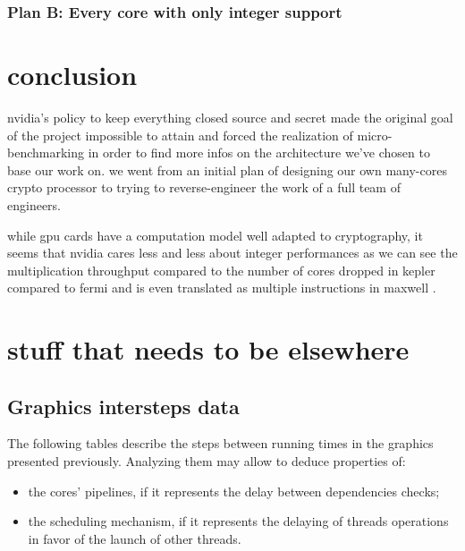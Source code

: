 \documentclass{report}
\begin{document}
   \subsection{Plan B: Every core with only integer support}
   
\chapter{conclusion}
    nvidia's policy to keep everything closed source and secret made the original 
    goal of the project impossible to attain and forced the realization of micro-benchmarking 
    in order to find more infos on the architecture we've chosen to base our work on. we went 
    from an initial plan of designing our own many-cores crypto processor to trying to 
    reverse-engineer the work of a full team of engineers.
    
    while gpu cards have a computation model well adapted to cryptography, it seems that nvidia
    cares less and less about integer performances as we can see the multiplication throughput
    compared to the number of cores dropped in kepler compared to fermi and is even translated as
    multiple instructions in maxwell \cite{cudaprog}.
   
  \appendix 
   
\chapter{stuff that needs to be elsewhere}
    \section{Graphics intersteps data}
    The following tables describe the steps between running times in the graphics presented previously. Analyzing them may allow to deduce properties of: 
    \begin{itemize} 
        \item the cores' pipelines, if it represents the delay between dependencies checks;
        \item the scheduling mechanism, if it represents the delaying of threads operations in favor of the launch of other threads.
    \end{itemize}
    
    \centering
    
    
    \pagebreak
    
\end{document}
